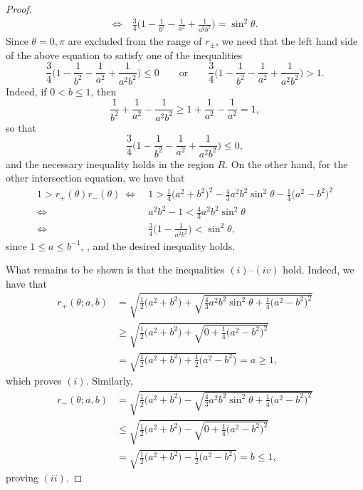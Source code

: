 \documentclass[10pt,a4paper]{amsart}
\numberwithin{equation}{section}
\begin{document}
\begin{proof}
\begin{align*}
 \Longleftrightarrow \ {}& \frac{3}{4}\biggl(1 -\frac{1}{b^2} - \frac{1}{a^2} + \frac{1}{a^2b^2}\biggr) = \sin^2\theta.
 \end{align*}
Since $\theta = 0,\pi$ are excluded from the range of $r_{\pm}$, we need that the left hand side of the above equation to satisfy one of the inequalities
 \begin{equation*}
 \frac{3}{4}\biggl(1 -\frac{1}{b^2} - \frac{1}{a^2} + \frac{1}{a^2b^2}\biggr) \leq 0 \qquad \text{or} \qquad
 \frac{3}{4}\biggl(1 -\frac{1}{b^2} - \frac{1}{a^2} + \frac{1}{a^2b^2}\biggr) > 1.
 \end{equation*}
Indeed, if $0< b \leq 1$, then
 \begin{equation*}
 \frac{1}{b^2} + \frac{1}{a^2} - \frac{1}{a^2b^2} \geq 1 + \frac{1}{a^2} - \frac{1}{a^2} = 1,
 \end{equation*}
so that
 \begin{equation*}
 \frac{3}{4}\biggl(1 -\frac{1}{b^2} - \frac{1}{a^2} + \frac{1}{a^2b^2}\biggr) \leq 0,
 \end{equation*}
and the necessary inequality holds in the region $R$. On the other hand, for the other intersection equation, we have that
 \begin{align*}
 1 > r_{+}(\theta)r_{-}(\theta) \ \Longleftrightarrow \ {}& 1 > \frac{1}{4}\bigl(a^2+b^2\bigr)^2 - \frac{4}{3}a^2b^2\sin^2\theta - \frac{1}{4}\bigl(a^2-b^2\bigr)^2\\
 \Longleftrightarrow \ {}& a^2b^2 - 1 < \frac{4}{3} a^2b^2\sin^2\theta\\
 \Longleftrightarrow \ {}& \frac{3}{4}\biggl(1 - \frac{1}{a^2b^2}\biggr) < \sin^2\theta,
 \end{align*}
since $1 \leq a \leq b^{-1}$, , and the desired inequality holds.

What remains to be shown is that the inequalities $(i)$--$(iv)$ hold. Indeed, we have that
 \begin{align*}
 r_+(\theta;a,b) &{}= \sqrt{\frac{1}{2}\bigl(a^2 + b^2\bigr) + \sqrt{\frac{4}{3}a^2b^2\sin^2\theta + \frac{1}{4}\bigl(a^2-b^2\bigr)^2}} \\
 &{}\geq \sqrt{\frac{1}{2}\bigl(a^2 + b^2\bigr) + \sqrt{0 + \frac{1}{4}\bigl(a^2-b^2\bigr)^2}} \\
 &{}= \sqrt{\frac{1}{2}\bigl(a^2 + b^2\bigr) + \frac{1}{2}\bigl(a^2-b^2\bigr)} = a \geq 1,
 \end{align*}
which proves $(i)$. Similarly,
 \begin{align*}
 r_-(\theta;a,b) &{}= \sqrt{\frac{1}{2}\bigl(a^2 + b^2\bigr) - \sqrt{\frac{4}{3}a^2b^2\sin^2\theta + \frac{1}{4}\bigl(a^2-b^2\bigr)^2}} \\
 &{}\leq \sqrt{\frac{1}{2}\bigl(a^2 + b^2\bigr) - \sqrt{0 + \frac{1}{4}\bigl(a^2-b^2\bigr)^2}} \\
 &{}= \sqrt{\frac{1}{2}\bigl(a^2 + b^2\bigr) - \frac{1}{2}\bigl(a^2-b^2\bigr)} = b \leq 1,
 \end{align*}
proving $(ii)$.


\end{proof}
\end{document}
